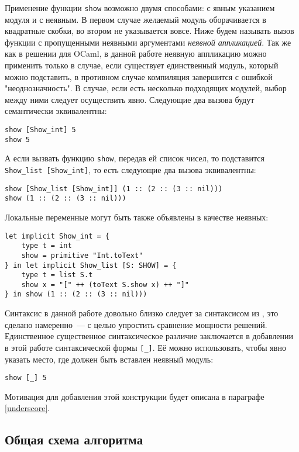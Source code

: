 \documentclass[../diploma.tex]{subfiles}
\begin{document}
Применение функции \texttt{show} возможно двумя способами: с явным указанием модуля и с неявным. В первом случае желаемый модуль оборачивается в квадратные скобки, во втором не указывается вовсе. Ниже будем называть вызов функции с пропущенными неявными аргументами \textit{неявной аппликацией}. Так же как в решении для OCaml, в данной работе неявную аппликацию можно применить только в случае, если существует единственный модуль, который можно подставить, в противном случае компиляция завершится с ошибкой "неоднозначность". В случае, если есть несколько подходящих модулей, выбор между ними следует осуществить явно. Следующие два вызова будут семантически эквивалентны:

\begin{verbatim}
show [Show_int] 5
show 5
\end{verbatim}

А если вызвать функцию \texttt{show}, передав ей список чисел, то подставится \\ \texttt{Show\_list [Show\_int]}, то есть следующие два вызова эквивалентны:

\begin{verbatim}
show [Show_list [Show_int]] (1 :: (2 :: (3 :: nil)))
show (1 :: (2 :: (3 :: nil)))
\end{verbatim}

Локальные переменные могут быть также объявлены в качестве неявных:

\begin{verbatim}
let implicit Show_int = {
    type t = int
    show = primitive "Int.toText"
} in let implicit Show_list [S: SHOW] = {
    type t = list S.t
    show x = "[" ++ (toText S.show x) ++ "]"
} in show (1 :: (2 :: (3 :: nil)))
\end{verbatim}

Синтаксис в данной работе довольно близко следует за синтаксисом из \cite{white}, это сделано намеренно~--- с целью упростить сравнение мощности решений. Единственное существенное синтаксическое различие заключается в добавлении в этой работе синтаксической формы \texttt{[\_]}. Её можно использовать, чтобы явно указать место, где должен быть вставлен неявный модуль:

\begin{verbatim}
show [_] 5
\end{verbatim}

Мотивация для добавления этой конструкции будет описана в параграфе \ref{underscore}.

\subsection{Общая схема алгоритма}
\end{document}
